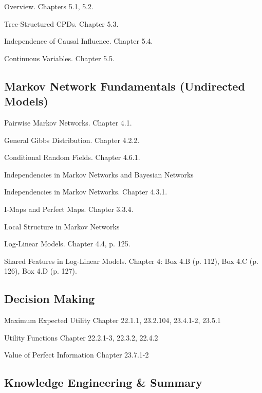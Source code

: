 \documentclass[12pt]{article}
\numberwithin{equation}{section}
\begin{document}
Overview. Chapters 5.1, 5.2.

Tree-Structured CPDs. Chapter 5.3.

Independence of Causal Influence. Chapter 5.4.

Continuous Variables. Chapter 5.5.

\subsection{Markov Network Fundamentals (Undirected Models)}

Pairwise Markov Networks. Chapter 4.1.

General Gibbs Distribution. Chapter 4.2.2.

Conditional Random Fields. Chapter 4.6.1.

Independencies in Markov Networks and Bayesian Networks

Independencies in Markov Networks. Chapter 4.3.1.

I-Maps and Perfect Maps. Chapter 3.3.4.

Local Structure in Markov Networks

Log-Linear Models. Chapter 4.4, p. 125.

Shared Features in Log-Linear Models. Chapter 4: Box 4.B (p. 112), Box 4.C (p. 126), Box 4.D (p. 127).

\subsection{Decision Making}

Maximum Expected Utility Chapter 22.1.1, 23.2.104, 23.4.1-2, 23.5.1

Utility Functions Chapter 22.2.1-3, 22.3.2, 22.4.2

Value of Perfect Information Chapter 23.7.1-2

\subsection{Knowledge Engineering \& Summary}

\renewcommand\refname{Reference}



  \clearpage
\end{document}
